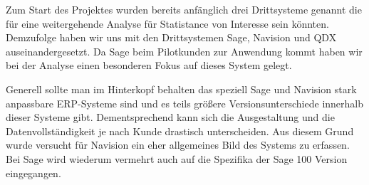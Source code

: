 Zum Start des Projektes wurden bereits anfänglich drei Drittsysteme genannt die für eine weitergehende Analyse für Statistance von Interesse sein könnten. Demzufolge haben wir uns mit den Drittsystemen Sage, Navision und QDX auseinandergesetzt. Da Sage beim Pilotkunden zur Anwendung kommt haben wir bei der Analyse einen besonderen Fokus auf dieses System gelegt.

Generell sollte man im Hinterkopf behalten das speziell Sage und Navision stark anpassbare ERP-Systeme sind und es teils größere Versionsunterschiede innerhalb dieser Systeme gibt. Dementsprechend kann sich die Ausgestaltung und die Datenvollständigkeit je nach Kunde drastisch unterscheiden.
Aus diesem Grund wurde versucht für Navision ein eher allgemeines Bild des Systems zu erfassen. Bei Sage wird wiederum vermehrt auch auf die Spezifika der Sage 100 Version eingegangen.





